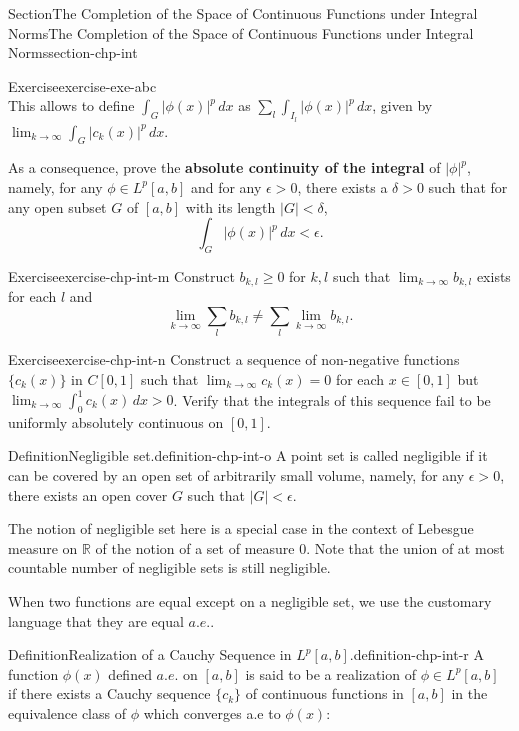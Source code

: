 \documentclass[oneside,10pt,]{article}
\newcommand{\terminology}[1]{\textbf{#1}}
\numberwithin{equation}{section}
\newcommand{\bbR}{\mathbb{R}}
\begin{document}
\begin{sectionptx}{Section}{The Completion of the Space of Continuous Functions under Integral Norms}{}{The Completion of the Space of Continuous Functions under Integral Norms}{}{}{section-chp-int}
\begin{inlineexercise}{Exercise}{}{exercise-exe-abc}
\begin{equation*}
\end{equation*}
This allows to define \(\int_{G} |\phi(x)|^{p}\, dx \) as \(\sum_{l} \int_{I_{l}} |\phi(x)|^{p}\, dx\), given by \(\lim_{k\to\infty} \int_{G} |c_{k}(x)|^{p}\, dx\).%
\par
As a consequence, prove the \terminology{absolute continuity of the integral} of \(|\phi|^{p}\), namely, for any \(\phi \in L^{p}[a, b]\) and for any \(\epsilon > 0\), there exists a \(\delta > 0\) such that for any open subset \(G\) of \([a, b]\) with its length \(|G| < \delta\),%
\begin{equation*}
\int_{G} |\phi(x)|^{p}\, dx < \epsilon.
\end{equation*}
%
\end{inlineexercise}%
\begin{inlineexercise}{Exercise}{}{exercise-chp-int-m}%
Construct \(b_{k, l}\ge 0\) for \(k, l\) such that \(\lim_{k\to\infty}  b_{k, l}\) exists for each \(l\) and%
\begin{equation*}
\lim_{k\to\infty} \sum_{l} b_{k, l}\ne \sum_{l} \lim_{k\to\infty}  b_{k, l}.
\end{equation*}
%
\end{inlineexercise}%
\begin{inlineexercise}{Exercise}{}{exercise-chp-int-n}%
Construct a sequence of non-negative functions \(\{c_{k}(x)\}\) in \(C[0, 1]\) such that \(\lim_{k\to\infty} c_{k}(x)=0\) for each \(x\in [0, 1]\) but \(\lim_{k\to\infty} \int_{0}^{1}c_{k}(x)\, dx > 0\). Verify that the integrals of this sequence fail to be uniformly absolutely continuous on \([0, 1]\).%
\end{inlineexercise}%
\begin{definition}{Definition}{Negligible set.}{definition-chp-int-o}%
A point set is called negligible if it can be covered by an open set of arbitrarily small volume, namely, for any \(\epsilon > 0\), there exists an open cover \(G\) such that \(|G| < \epsilon\).%
\end{definition}
The notion of negligible set here is a special case in the context of Lebesgue measure on \(\bbR\) of the notion of a set of measure \(0\). Note that the union of at most countable number of negligible sets is still negligible.%
\par
When two functions are equal  except on a negligible set, we use the customary language that they are equal \(a.e.\).%
\begin{definition}{Definition}{Realization of a Cauchy Sequence in \(L^{p}[a, b]\).}{definition-chp-int-r}%
A function \(\phi (x)\) defined \(a.e.\) on \([a,  b]\) is said to be a realization of \(\phi \in L^{p}[a, b]\) if there exists a Cauchy sequence \(\{c_{k}\}\) of continuous functions in \([a, b]\) in the equivalence class of \(\phi\) which converges a.e to \(\phi (x)\):%

\end{definition}
\end{sectionptx}
\end{document}
